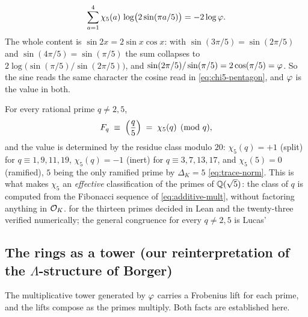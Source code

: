 \begin{proposition}\label{prop:log-signature}
\begin{equation}\label{eq:log-signature}
  \sum_{a=1}^{4}\chi_5(a)\,\log\bigl(2\sin(\pi a/5)\bigr)=-2\log\varphi .
\end{equation}
The whole content is $\sin2x=2\sin x\cos x$: with $\sin(3\pi/5)=\sin(2\pi/5)$ and
$\sin(4\pi/5)=\sin(\pi/5)$ the sum collapses to $2\log\bigl(\sin(\pi/5)/\sin(2\pi/5)\bigr)$, and
$\sin(2\pi/5)/\sin(\pi/5)=2\cos(\pi/5)=\varphi$. So the sine reads the same character the cosine
read in \eqref{eq:chi5-pentagon}, and $\varphi$ is the value in both.


\end{proposition}

\begin{proposition}\label{prop:fib-criterion}
For every rational prime $q\neq2,5$,
\begin{equation}\label{eq:fib-criterion}
  F_q\;\equiv\;\Bigl(\frac{q}{5}\Bigr)\;=\;\chi_5(q)\pmod q ,
\end{equation}
and the value is determined by the residue class modulo $20$: $\chi_5(q)=+1$ (split) for
$q\equiv1,9,11,19$, $\chi_5(q)=-1$ (inert) for $q\equiv3,7,13,17$, and $\chi_5(5)=0$ (ramified),
$5$ being the only ramified prime by $\Delta_K=5$ \eqref{eq:trace-norm}. This is what makes
$\chi_5$ an \emph{effective} classification of the primes of $\mathbb{Q}(\sqrt5)$: the class of $q$ is
computed from the Fibonacci sequence of \eqref{eq:additive-mult}, without factoring anything in
$\mathcal{O}_K$.  for the thirteen primes decided in Lean and the twenty-three verified numerically;
the general congruence for every $q\neq2,5$ is Lucas'~\cite{Lucas1878}

\end{proposition}

\subsection{The rings as a tower (our reinterpretation of the $\Lambda$-structure of Borger)}\label{ssec:tower}

The multiplicative tower generated by $\varphi$ carries a Frobenius lift for each prime, and the
lifts compose as the primes multiply. Both facts are established here.

